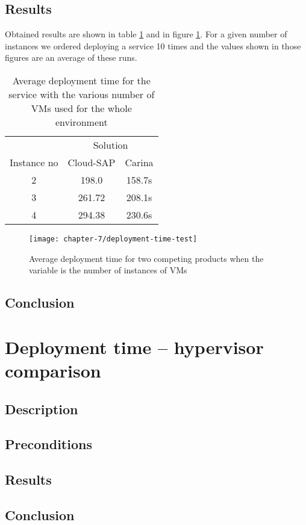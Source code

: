 \subsection*{Results}
Obtained results are shown in table \ref{tbl:test-service-deployment-time} and in figure \ref{ch7:deployment-time-test}. For a given number of instances we ordered deploying a service 10 times and the values shown in those figures are an average of these runs.

\begin{table}
  \centering
  \begin{tabular}{ c  c  c }
    \hline
    & \multicolumn{2}{c}{Solution} \\
    \cline{2-3}
    Instance no & Cloud-SAP & Carina \\
    \hline
    2 & 198.0 & 158.7s \\
    3 & 261.72 & 208.1s \\
    4 & 294.38 & 230.6s \\
    \hline
  \end{tabular}
  \caption{Average deployment time for the service with the various number of VMs used for the whole environment}
  \label{tbl:test-service-deployment-time}
\end{table}

\begin{figure}[!ht]
  \begin{center}
    \texttt{[image: chapter-7/deployment-time-test]}
  \end{center}
  \caption{Average deployment time for two competing products when the variable is the number of instances of VMs}
  \label{ch7:deployment-time-test}
\end{figure}

\subsection*{Conclusion}


\section{Deployment time -- hypervisor comparison}
\subsection*{Description}
\subsection*{Preconditions}
\subsection*{Results}
\subsection*{Conclusion}

